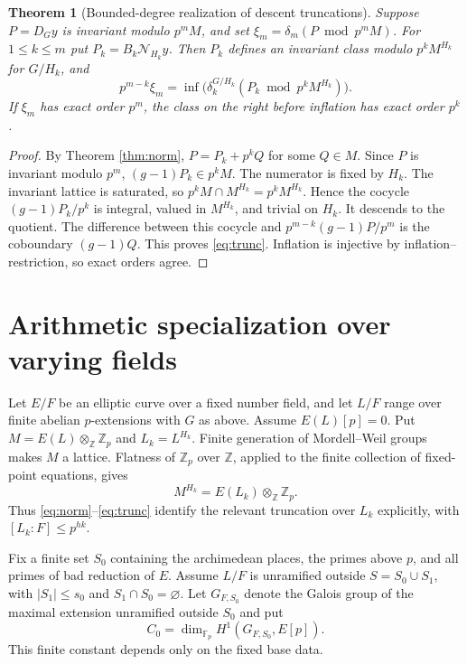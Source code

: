 \documentclass[11pt,a4paper]{article}
\newtheorem{theorem}{Theorem}[section]
\theoremstyle{definition}
\theoremstyle{remark}
\newcommand{\Zp}{\mathbb Z_p}
\newcommand{\Fp}{\mathbb F_p}
\newcommand{\N}{\mathcal N}
\begin{document}
\begin{theorem}[Bounded-degree realization of descent truncations]\label{thm:trunc}
Suppose $P=D_Gy$ is invariant modulo $p^mM$, and set $\xi_m=\delta_m(P\bmod p^mM)$. For $1\le k\le m$ put $P_k=B_k\N_{H_k}y$. Then $P_k$ defines an invariant class modulo $p^kM^{H_k}$ for $G/H_k$, and
\begin{equation}\label{eq:trunc}
 p^{m-k}\xi_m=\operatorname{inf}\bigl(\delta_k^{G/H_k}(P_k\bmod p^kM^{H_k})\bigr).
\end{equation}
If $\xi_m$ has exact order $p^m$, the class on the right before inflation has exact order $p^k$.
\end{theorem}
\begin{proof}
By Theorem \ref{thm:norm}, $P=P_k+p^kQ$ for some $Q\in M$. Since $P$ is invariant modulo $p^m$, $(g-1)P_k\in p^kM$. The numerator is fixed by $H_k$. The invariant lattice is saturated, so $p^kM\cap M^{H_k}=p^kM^{H_k}$. Hence the cocycle $(g-1)P_k/p^k$ is integral, valued in $M^{H_k}$, and trivial on $H_k$. It descends to the quotient. The difference between this cocycle and $p^{m-k}(g-1)P/p^m$ is the coboundary $(g-1)Q$. This proves \eqref{eq:trunc}. Inflation is injective by inflation--restriction, so exact orders agree.
\end{proof}

\section{Arithmetic specialization over varying fields}
Let $E/F$ be an elliptic curve over a fixed number field, and let $L/F$ range over finite abelian $p$-extensions with $G$ as above. Assume $E(L)[p]=0$. Put $M=E(L)\otimes_{\mathbb Z}\Zp$ and $L_k=L^{H_k}$. Finite generation of Mordell--Weil groups makes $M$ a lattice. Flatness of $\Zp$ over $\mathbb Z$, applied to the finite collection of fixed-point equations, gives
\[
 M^{H_k}=E(L_k)\otimes_{\mathbb Z}\Zp.
\]
Thus \eqref{eq:norm}--\eqref{eq:trunc} identify the relevant truncation over $L_k$ explicitly, with $[L_k:F]\le p^{hk}$.

Fix a finite set $S_0$ containing the archimedean places, the primes above $p$, and all primes of bad reduction of $E$. Assume $L/F$ is unramified outside $S=S_0\cup S_1$, with $|S_1|\le s_0$ and $S_1\cap S_0=\varnothing$. Let $G_{F,S_0}$ denote the Galois group of the maximal extension unramified outside $S_0$ and put
\[
 C_0=\dim_{\Fp}H^1(G_{F,S_0},E[p]).
\]
This finite constant depends only on the fixed base data.
\end{document}
